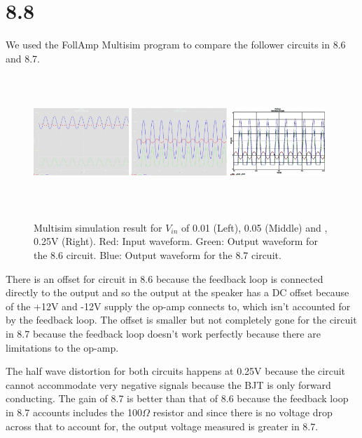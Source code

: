 \documentclass[authoryear, 12pt,5p, times]{elsarticle}
\begin{document}
 \section*{8.8}
 We used the FollAmp Multisim program to compare the follower circuits in 8.6 and 8.7. 
 \begin{figure}[h!]
  \includegraphics[width=0.32\textwidth,height=5cm]{figure/001V.JPG}
    \includegraphics[width=0.32\textwidth,height=5cm]{figure/005V.JPG}
      \includegraphics[width=0.32\textwidth,height=5cm]{figure/025V.JPG}
\caption{Multisim simulation result for $V_{in}$ of 0.01 (Left), 0.05 (Middle) and , 0.25V (Right). Red: Input waveform. Green: Output waveform for the 8.6 circuit. Blue: Output waveform for the 8.7 circuit.}
\label{multisim}
\end{figure}
\par There is an offset for circuit in 8.6 because the feedback loop is connected directly to the output and so the output at the speaker has a DC offset because of the +12V and -12V supply the op-amp connects to, which isn’t accounted for by the feedback loop. The offset is smaller but not completely gone  for the circuit in 8.7 because the feedback loop doesn’t work perfectly because there are limitations to the op-amp. 
\par The half wave distortion for both circuits happens at 0.25V because the circuit cannot accommodate very negative signals because the BJT is only forward conducting. The gain of 8.7 is better than that of 8.6 because the feedback loop in 8.7 accounts includes the 100$\Omega$ resistor and since there is no voltage drop across that to account for, the output voltage measured is greater in 8.7.
\end{document}
